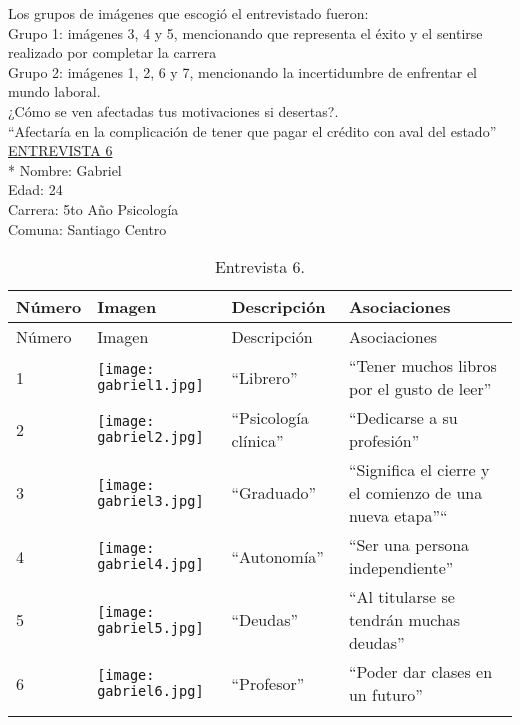 Los grupos de imágenes que escogió el entrevistado fueron:\\

Grupo 1: imágenes 3, 4 y 5, mencionando que representa el éxito y el sentirse realizado por completar la carrera \\

Grupo 2: imágenes 1, 2, 6 y 7, mencionando la incertidumbre de enfrentar el mundo laboral.\\


¿Cómo se ven afectadas tus motivaciones si desertas?.\\

``Afectaría en la complicación de tener que pagar el crédito con aval del estado''\\


\underline {ENTREVISTA 6}\\*
Nombre: Gabriel\\
Edad: 24\\
Carrera: 5to Año Psicología\\
Comuna: Santiago Centro\\

\begin{longtable}{>{\centering\arraybackslash}m{1cm} >{\centering\arraybackslash}m{2cm} >{\arraybackslash}m{5cm}>{\arraybackslash}m{5cm}}
	
	\hline
	Número & Imagen & Descripción & Asociaciones \\
	\hline \hline
	\endfirsthead
	
	\hline
	Número & Imagen & Descripción & Asociaciones \\
	\hline \hline
	\endhead

1 & \texttt{[image: gabriel1.jpg]} & ``Librero'' & ``Tener muchos libros por el gusto de leer'' \\
\hline

2 & \texttt{[image: gabriel2.jpg]} & ``Psicología clínica'' & ``Dedicarse a su profesión'' \\
\hline

3 & \texttt{[image: gabriel3.jpg]} & ``Graduado'' & ``Significa el cierre y el comienzo de una nueva etapa''`` \\
\hline

4 & \texttt{[image: gabriel4.jpg]} & ``Autonomía'' & ``Ser una persona independiente'' \\
\hline

5 & \texttt{[image: gabriel5.jpg]} & ``Deudas'' & ``Al titularse se tendrán muchas deudas'' \\
\hline

6 & \texttt{[image: gabriel6.jpg]} & ``Profesor'' & ``Poder dar clases en un futuro''\\
\hline


\caption{Entrevista 6.}
\label{tabla:gabriel}
\end{longtable}

